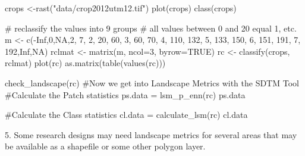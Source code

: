 \documentclass[
  letterpaper,
]{book}
\newenvironment{Shaded}{\begin{snugshade}}{\end{snugshade}}
\newcommand{\AttributeTok}[1]{\textcolor[rgb]{0.40,0.45,0.13}{#1}}
\newcommand{\CommentTok}[1]{\textcolor[rgb]{0.37,0.37,0.37}{#1}}
\newcommand{\ConstantTok}[1]{\textcolor[rgb]{0.56,0.35,0.01}{#1}}
\newcommand{\DecValTok}[1]{\textcolor[rgb]{0.68,0.00,0.00}{#1}}
\newcommand{\FunctionTok}[1]{\textcolor[rgb]{0.28,0.35,0.67}{#1}}
\newcommand{\NormalTok}[1]{\textcolor[rgb]{0.00,0.23,0.31}{#1}}
\newcommand{\OtherTok}[1]{\textcolor[rgb]{0.00,0.23,0.31}{#1}}
\newcommand{\SpecialCharTok}[1]{\textcolor[rgb]{0.37,0.37,0.37}{#1}}
\newcommand{\StringTok}[1]{\textcolor[rgb]{0.13,0.47,0.30}{#1}}
\begin{document}
\begin{Shaded}
\begin{Highlighting}[]
\NormalTok{crops }\OtherTok{\textless{}{-}}\FunctionTok{rast}\NormalTok{(}\StringTok{"data/crop2012utm12.tif"}\NormalTok{)}
\FunctionTok{plot}\NormalTok{(crops)}
\FunctionTok{class}\NormalTok{(crops)}

\CommentTok{\# reclassify the values into 9 groups}
\CommentTok{\# all values between 0 and 20 equal 1, etc.}
\NormalTok{m }\OtherTok{\textless{}{-}} \FunctionTok{c}\NormalTok{(}\SpecialCharTok{{-}}\ConstantTok{Inf}\NormalTok{,}\DecValTok{0}\NormalTok{,}\ConstantTok{NA}\NormalTok{,}\DecValTok{2}\NormalTok{, }\DecValTok{7}\NormalTok{, }\DecValTok{2}\NormalTok{, }\DecValTok{20}\NormalTok{, }\DecValTok{60}\NormalTok{, }\DecValTok{3}\NormalTok{, }\DecValTok{60}\NormalTok{, }\DecValTok{70}\NormalTok{, }\DecValTok{4}\NormalTok{, }\DecValTok{110}\NormalTok{, }\DecValTok{132}\NormalTok{, }\DecValTok{5}\NormalTok{, }\DecValTok{133}\NormalTok{, }\DecValTok{150}\NormalTok{, }\DecValTok{6}\NormalTok{, }\DecValTok{151}\NormalTok{, }\DecValTok{191}\NormalTok{, }\DecValTok{7}\NormalTok{, }
  \DecValTok{192}\NormalTok{,}\ConstantTok{Inf}\NormalTok{,}\ConstantTok{NA}\NormalTok{)}
\NormalTok{rclmat }\OtherTok{\textless{}{-}} \FunctionTok{matrix}\NormalTok{(m, }\AttributeTok{ncol=}\DecValTok{3}\NormalTok{, }\AttributeTok{byrow=}\ConstantTok{TRUE}\NormalTok{)}
\NormalTok{rc }\OtherTok{\textless{}{-}} \FunctionTok{classify}\NormalTok{(crops, rclmat)}
\FunctionTok{plot}\NormalTok{(rc)}
\FunctionTok{as.matrix}\NormalTok{(}\FunctionTok{table}\NormalTok{(}\FunctionTok{values}\NormalTok{(rc)))}

\FunctionTok{check\_landscape}\NormalTok{(rc)}
\CommentTok{\#Now we get into Landscape Metrics with the SDTM Tool}
\CommentTok{\#Calculate the Patch statistics}
\NormalTok{ps.data }\OtherTok{=} \FunctionTok{lsm\_p\_enn}\NormalTok{(rc)}
\NormalTok{ps.data}

\CommentTok{\#Calculate the Class statistics}
\NormalTok{cl.data }\OtherTok{=} \FunctionTok{calculate\_lsm}\NormalTok{(rc)}
\NormalTok{cl.data}
\end{Highlighting}
\end{Shaded}

5. Some research designs may need landscape metrics for several areas
that may be available as a shapefile or some other polygon layer.
\end{document}
